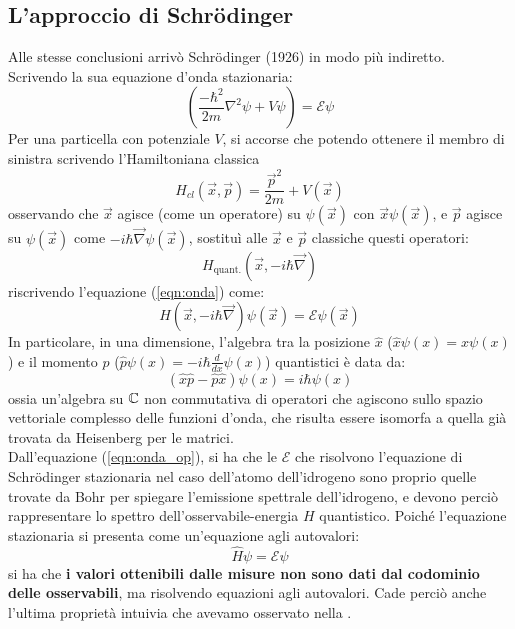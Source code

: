 \documentclass[FisicaTeorica.tex]{subfiles}
\begin{document}
\subsection{L'approccio di Schrödinger}
Alle stesse conclusioni arrivò Schrödinger (1926) in modo più indiretto.\\
Scrivendo la sua equazione d'onda stazionaria:
\begin{equation}
    \left(\frac{{-\hbar}^2}{2m}\nabla^2\psi+V\psi\right)=\mathcal{E}\psi
    \label{eqn:onda}
\end{equation}
Per una particella con potenziale $V$, si accorse che potendo ottenere il membro di sinistra scrivendo l'Hamiltoniana classica 
\[H_{cl}\left(\vec{x},\vec{p}\right)=\frac{{\vec{p}}^2}{2m}+V(\vec{x})\]
osservando che $\vec{x}$ agisce (come un operatore) su $\psi(\vec{x})$ con $\vec{x}\psi(\vec{x})$, e $\vec{p}$ agisce su $\psi(\vec{x})$ come $-i\hbar \vec{\nabla}\psi(\vec{x})$, sostituì alle $\vec{x}$ e $\vec{p}$ classiche questi operatori:
\[
H_{\text{quant.}}(\vec{x}, -i\hbar \vec{\nabla})
\]
riscrivendo l'equazione (\ref{eqn:onda}) come:
\begin{equation}
H\left(\vec{x},-i\hbar\vec{\nabla}\right)\psi\left(\vec{x}\right)=\mathcal{E}\psi\left(\vec{x}\right)
\label{eqn:onda_op}
\end{equation}
In particolare, in una dimensione, l'algebra tra la posizione $\hat{x}$ ($\hat{x}\psi(x) = x\psi(x)$) e il momento $\hat{p}$ ($\hat{p}\psi(x) = -i\hbar \frac{d}{dx}\psi(x)$) quantistici è data da:
\[
\left(\hat{x}\hat{p}-\hat{p}\hat{x}\right)\psi\left(x\right)=i\hbar\psi\left(x\right)
\]
ossia un'algebra su $\mathbb{C}$ non commutativa di operatori che agiscono sullo spazio vettoriale complesso delle funzioni d'onda, che risulta essere isomorfa a quella già trovata da Heisenberg per le matrici.\\
Dall'equazione (\ref{eqn:onda_op}), si ha che le $\mathcal{E}$ che risolvono l'equazione di Schrödinger stazionaria nel caso dell'atomo dell'idrogeno sono proprio quelle trovate da Bohr per spiegare l'emissione spettrale dell'idrogeno, e devono perciò rappresentare lo spettro dell'osservabile-energia $H$ quantistico. Poiché l'equazione stazionaria si presenta come un'equazione agli autovalori:
\[
\hat{H}\psi = \mathcal{E}\psi
\]
si ha che \textbf{i valori ottenibili dalle misure non sono dati dal codominio delle osservabili}, ma risolvendo equazioni agli autovalori. Cade perciò anche l'ultima proprietà intuivia che avevamo osservato nella \MC.\\
\end{document}
